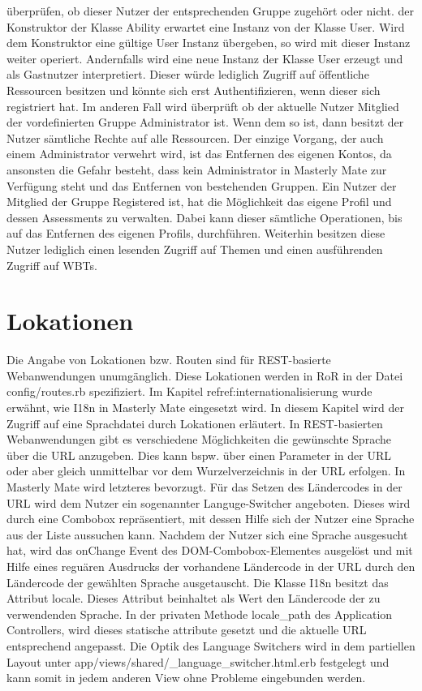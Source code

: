 \begin{k}
überprüfen, ob dieser Nutzer der entsprechenden Gruppe zugehört oder nicht.
der Konstruktor der Klasse Ability erwartet eine Instanz von der Klasse
User. Wird dem Konstruktor eine gültige User Instanz übergeben, so wird
mit dieser Instanz weiter operiert. Andernfalls wird eine neue Instanz der
Klasse User erzeugt und als Gastnutzer interpretiert. Dieser würde lediglich
Zugriff auf öffentliche Ressourcen besitzen und könnte sich erst
Authentifizieren, wenn dieser sich registriert hat. Im anderen Fall wird
überprüft ob der aktuelle Nutzer Mitglied der vordefinierten Gruppe
Administrator ist. Wenn dem so ist, dann besitzt der Nutzer sämtliche Rechte auf
alle Ressourcen. Der einzige Vorgang, der auch einem Administrator verwehrt
wird, ist das Entfernen des eigenen Kontos, da ansonsten die Gefahr
besteht, dass kein Administrator in Masterly Mate zur Verfügung steht und das
Entfernen von bestehenden Gruppen. Ein Nutzer der Mitglied der Gruppe Registered
ist, hat die Möglichkeit das eigene Profil und dessen Assessments zu verwalten.
Dabei kann dieser sämtliche Operationen, bis auf das Entfernen des eigenen Profils,
durchführen. Weiterhin besitzen diese Nutzer lediglich einen lesenden Zugriff
auf Themen und einen ausführenden Zugriff auf WBTs.
\end{k}

\section{Lokationen}
Die Angabe von Lokationen bzw. Routen sind für REST-basierte Webanwendungen
unumgänglich. Diese Lokationen werden in RoR in der Datei 
config/routes.rb spezifiziert. Im Kapitel ref{ref:internationalisierung}
wurde erwähnt, wie I18n in Masterly Mate eingesetzt wird. In diesem Kapitel wird der
Zugriff auf eine Sprachdatei durch Lokationen erläutert. In REST-basierten
Webanwendungen gibt es verschiedene Möglichkeiten die gewünschte Sprache über
die URL anzugeben. Dies kann bspw. über einen Parameter in der URL oder
aber gleich unmittelbar vor dem Wurzelverzeichnis in der URL erfolgen. In
Masterly Mate wird letzteres bevorzugt. Für das Setzen des Ländercodes in der
URL wird dem Nutzer ein sogenannter Languge-Switcher angeboten. Dieses wird
durch eine Combobox repräsentiert, mit dessen Hilfe sich der Nutzer eine Sprache
aus der Liste aussuchen kann. Nachdem der Nutzer sich eine Sprache ausgesucht
hat, wird das onChange Event des DOM-Combobox-Elementes ausgelöst und mit Hilfe
eines reguären Ausdrucks der vorhandene Ländercode in der URL durch den
Ländercode der gewählten Sprache ausgetauscht. Die Klasse I18n besitzt das
Attribut locale. Dieses Attribut beinhaltet als Wert den Ländercode der zu
verwendenden Sprache. In der privaten Methode locale_path des Application
Controllers, wird dieses statische attribute gesetzt und die aktuelle URL
entsprechend angepasst. Die Optik des Language Switchers wird in dem partiellen
Layout unter app/views/shared/_language_switcher.html.erb festgelegt und kann
somit in jedem anderen View ohne Probleme eingebunden werden.
\begin{k}

\end{k}

